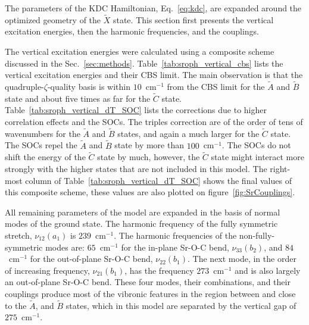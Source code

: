 \documentclass{article}
\begin{document}
The parameters of the KDC Hamiltonian, Eq.~\eqref{eq:kdc}, are expanded around
the optimized geometry of the $\tilde{X}$ state. This section first presents
the vertical excitation energies, then the harmonic frequencies, and the
couplings.

The vertical excitation energies were calculated using a composite scheme
discussed in the Sec.~\ref{sec:methods}. Table~\ref{tab:sroph_vertical_cbs}
lists the vertical excitation energies and their CBS limit. The main
observation is that the quadruple-$\zeta$-quality basis is within
$10$~cm$^{-1}$ from the CBS limit for the $\tilde{A}$ and $\tilde{B}$ state and
about five times as far for the $\tilde{C}$ state.
Table~\ref{tab:sroph_vertical_dT_SOC} lists the corrections due to higher
correlation effects and the SOCs. The triples correction are of the order of
tens of wavenumbers for the $\tilde{A}$ and $\tilde{B}$ states, and again a
much larger for the $\tilde{C}$ state. The SOCs repel the $\tilde{A}$ and
$\tilde{B}$ state by more than $100$~cm$^{-1}$. The SOCs do not shift the
energy of the $\tilde{C}$ state by much, however, the $\tilde{C}$ state might
interact more strongly with the higher states that are not included in this
model. The right-most column of Table~\ref{tab:sroph_vertical_dT_SOC} shows the
final values of this composite scheme, these values are also plotted on
figure~\ref{fig:SrCouplings}.

All remaining parameters of the model are expanded in the basis of normal modes
of the ground state. The harmonic frequency of the fully symmetric stretch,
$\nu _{12} (a_1)$ is $239$~cm$^{-1}$. The harmonic frequencies of the
non-fully-symmetric modes are: $65$~cm$^{-1}$ for the in-plane Sr-O-C bend,
$\nu _{33}(b_2)$, and $84$~cm$^{-1}$ for the out-of-plane Sr-O-C bend, $\nu
_{22} (b _1)$. The next mode, in the order of increasing frequency, $\nu _{21}
(b _1)$, has the frequency $273$~cm$^{-1}$ and is also largely an out-of-plane
Sr-O-C bend. These four modes, their combinations, and their couplings produce
most of the vibronic features in the region between and close to the
$\tilde{A}$, and $\tilde{B}$ states, which in this model are separated by the
vertical gap of $275$~cm$^{-1}$.
\end{document}
